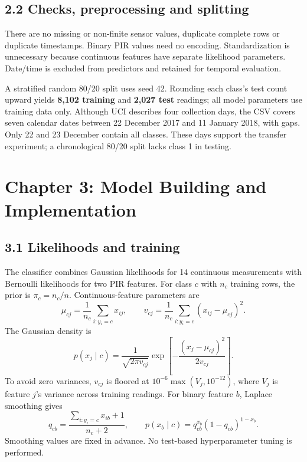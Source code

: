 \documentclass[12pt,a4paper]{article}
\begin{document}
\subsection{2.2 Checks, preprocessing and splitting}
There are no missing or non-finite sensor values, duplicate complete rows or duplicate timestamps. Binary PIR values need no encoding. Standardization is unnecessary because continuous features have separate likelihood parameters. Date/time is excluded from predictors and retained for temporal evaluation.

A stratified random 80/20 split uses seed 42. Rounding each class's test count upward yields \textbf{8,102 training} and \textbf{2,027 test} readings; all model parameters use training data only. Although UCI describes four collection days, the CSV covers seven calendar dates between 22 December 2017 and 11 January 2018, with gaps. Only 22 and 23 December contain all classes. These days support the transfer experiment; a chronological 80/20 split lacks class 1 in testing.

\clearpage
\section{Chapter 3: Model Building and Implementation}
\subsection{3.1 Likelihoods and training}
The classifier combines Gaussian likelihoods for 14 continuous measurements with Bernoulli likelihoods for two PIR features. For class $c$ with $n_c$ training rows, the prior is $\pi_c=n_c/n$. Continuous-feature parameters are
\begin{equation}
\mu_{cj}=\frac{1}{n_c}\sum_{i:y_i=c}x_{ij},\qquad
v_{cj}=\frac{1}{n_c}\sum_{i:y_i=c}(x_{ij}-\mu_{cj})^2.
\end{equation}
The Gaussian density is
\begin{equation}
p(x_j\mid c)=\frac{1}{\sqrt{2\pi v_{cj}}}
\exp\!\left[-\frac{(x_j-\mu_{cj})^2}{2v_{cj}}\right].
\end{equation}
To avoid zero variances, $v_{cj}$ is floored at $10^{-6}\max(V_j,10^{-12})$, where $V_j$ is feature $j$'s variance across training readings. For binary feature $b$, Laplace smoothing gives
\begin{equation}
q_{cb}=\frac{\sum_{i:y_i=c}x_{ib}+1}{n_c+2},\qquad
p(x_b\mid c)=q_{cb}^{x_b}(1-q_{cb})^{1-x_b}.
\end{equation}
Smoothing values are fixed in advance. No test-based hyperparameter tuning is performed.
\end{document}
